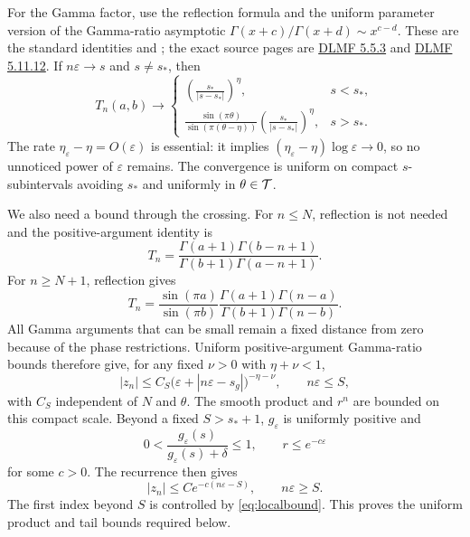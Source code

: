 \documentclass[11pt]{article}
\theoremstyle{definition}
\theoremstyle{remark}
\newcommand{\eps}{\varepsilon}
\begin{document}
For the Gamma factor, use the reflection formula and the uniform
parameter version of the Gamma-ratio asymptotic
\(\Gamma(x+c)/\Gamma(x+d)\sim x^{c-d}\).  These are the standard identities
\cite[Eq.~5.5.3]{DLMF55} and \cite[Eq.~5.11.12]{DLMF511}; the exact
source pages are
\href{https://dlmf.nist.gov/5.5.E3}{DLMF 5.5.3} and
\href{https://dlmf.nist.gov/5.11.E12}{DLMF 5.11.12}.  If
\(n\eps\to s\) and \(s\ne s_*\), then
\begin{equation}\label{eq:Tlimit}
 T_n(a,b)\longrightarrow
 \begin{cases}
 \displaystyle
  \left(\frac{s_*}{|s-s_*|}\right)^\eta,
     &s<s_*,\\[1.2ex]
 \displaystyle
  \frac{\sin(\pi\theta)}{\sin(\pi(\theta-\eta))}
  \left(\frac{s_*}{|s-s_*|}\right)^\eta,
     &s>s_*.
 \end{cases}
\end{equation}
The rate \(\eta_\eps-\eta=O(\eps)\) is essential: it implies
\((\eta_\eps-\eta)\log\eps\to0\), so no unnoticed power of \(\eps\) remains.
The convergence is uniform on compact \(s\)-subintervals avoiding \(s_*\)
and uniformly in \(\theta\in{\cal T}\).

We also need a bound through the crossing.  For \(n\leq N\), reflection is
not needed and the positive-argument identity is
\[
 T_n=
 \frac{\Gamma(a+1)\Gamma(b-n+1)}
      {\Gamma(b+1)\Gamma(a-n+1)}.
\]
For \(n\geq N+1\), reflection gives
\[
 T_n=
 \frac{\sin(\pi a)}{\sin(\pi b)}
 \frac{\Gamma(a+1)\Gamma(n-a)}
      {\Gamma(b+1)\Gamma(n-b)}.
\]
All Gamma arguments that can be small remain a fixed distance from zero
because of the phase restrictions.  Uniform positive-argument Gamma-ratio
bounds therefore give, for any fixed \(\nu>0\) with
\(\eta+\nu<1\),
\begin{equation}\label{eq:localbound}
 |z_n|\leq C_S
 \bigl(\eps+|n\eps-s_g|\bigr)^{-\eta-\nu},
 \qquad n\eps\leq S,
\end{equation}
with \(C_S\) independent of \(N\) and \(\theta\).  The smooth product and
\(r^n\) are bounded on this compact scale.  Beyond a fixed
\(S>s_*+1\), \(g_\eps\) is uniformly positive and
\[
  0<\frac{g_\eps(s)}{g_\eps(s)+\delta}\leq1,
  \qquad
  r\leq e^{-c\eps}
\]
for some \(c>0\).  The recurrence then gives
\begin{equation}\label{eq:tailbound}
 |z_n|\leq C e^{-c(n\eps-S)},\qquad n\eps\geq S.
\end{equation}
The first index beyond \(S\) is controlled by \eqref{eq:localbound}.  This
proves the uniform product and tail bounds required below.
\end{document}
